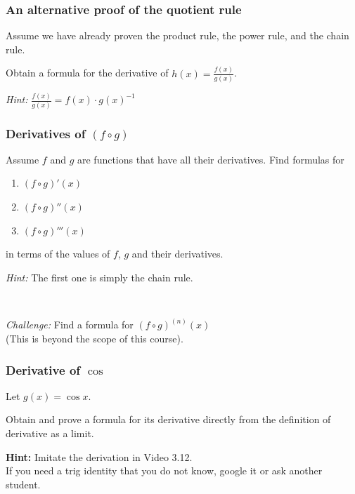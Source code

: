 \documentclass[14pt]{beamer}
\begin{document}
\begin{frame}[t]
	\frametitle{An alternative proof of the quotient rule}

	Assume we have already proven the product rule, the power rule, and the chain
	rule.

	Obtain a formula for the derivative of
	$\displaystyle h(x) = \frac{f(x)}{g(x)}$.

	\emph{Hint:} $\displaystyle \frac{f(x)}{g(x)}= f(x) \cdot g(x)^{-1}$
\end{frame}

\begin{frame}
	\frametitle{Derivatives of $\displaystyle (f \circ g)$}

	Assume $f$ and $g$ are functions that have all their derivatives. Find formulas
	for
	\begin{enumerate}
		\item $\displaystyle (f \circ g)'(x)$

		\item $\displaystyle (f \circ g)''(x)$

		\item $\displaystyle (f \circ g)'''(x)$
	\end{enumerate}

	in terms of the values of $f$, $g$ and their derivatives.

	\emph{Hint:} The first one is simply the chain rule.

	\

	\emph{Challenge:} Find a formula for $\displaystyle (f \circ g)^{(n)}(x)$ \\ (This
	is beyond the scope of this course).
\end{frame}

\begin{frame}[t]
	\frametitle{Derivative of $\cos$}

	Let $\displaystyle g(x) = \cos x.$

	Obtain and prove a formula for its derivative directly from the definition of derivative
	as a limit.

	\vfill

	{\bfseries Hint:} Imitate the derivation in Video 3.12. \\ If you need a trig identity
	that you do not know, google it or ask another student.




\end{frame}
\end{document}
